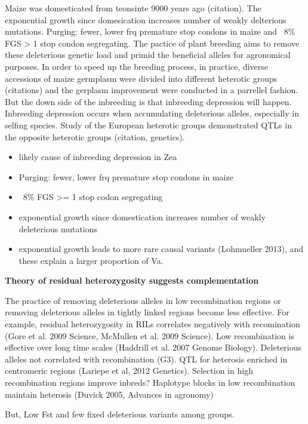 \documentclass[10pt]{article}
\begin{document}
Maize was domesticated from teonsinte 9000 years ago (citation). The exponential growth since domesication increases number of weakly delterious mutations. Purging: fewer, lower frq premature stop condons in maize and ~8\% FGS > 1 stop condon segregating. The pactice of plant breeding aims to remove these deleterious genetic load and primid the beneficial alleles for agronomical purposes. In order to speed up the breeding process, in practice, diverse accessions of maize germplasm were divided into different heterotic groups (citations) and the gerplasm improvement were conducted in a parrellel fashion. But the down side of the inbreeding is that inbreeding depression will happen. Inbreeding depression occurs when accumulating deleterious alleles, especially in selfing species. Study of the European heterotic groups demonstrated QTLs in the opposite heterotic groups (citation, genetics).    

\begin{itemize}
  \item likely cause of inbreeding depression in Zea
  \item Purging: fewer, lower frq premature stop condons in maize
  \item ~8\% FGS >= 1 stop codon segregating
  \item exponential growth since domestication increases number of weakly deleterious mutations
  \item exponential growth leads to more rare causal variants (Lohmueller 2013), and these explain a larger proportion of Va.
\end{itemize}


\textbf{Theory of residual heterozygosity suggests complementation} 

The practice of removing deleterious alleles in low recombination regions or removing deleterious alleles in tightly linked regions become less effective. For example, residual heterozygosity in RILs correlates negatively with recomination (Gore et al. 2009 Science, McMullen et al. 2009 Science). Low recombination is effective over long time scales (Haddrill et al. 2007 Genome Biology). Deleterious alleles not correlated with recombination (G3). QTL for heterosis enriched in centromeric regions (Lariepe et al, 2012 Genetics).
Selection in high recombination regions improve inbreds?
Haplotype blocks in low recombination maintain heterosis (Duvick 2005, Advances in agronomy)


But, Low Fst and few fixed deleterious variants among groups. 
\end{document}
